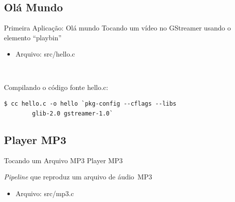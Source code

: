 \documentclass{beamer}
\def\en#1{\foreignlanguage{english}{\emph{#1}}}
\begin{document}
\subsection{Olá Mundo}

\begin{frame}[fragile]{Primeira Aplicação: Olá mundo}
  Tocando um vídeo no GStreamer usando o elemento ``playbin''
  \begin{itemize}
    \item Arquivo: src/hello.c
  \end{itemize}
  ~

  Compilando o código fonte hello.c:
  \begin{lstlisting}[style=command]
  $ cc hello.c -o hello `pkg-config --cflags --libs
        glib-2.0 gstreamer-1.0`
  \end{lstlisting}
\end{frame}

\subsection{Player MP3}

\begin{frame}[c]{Tocando um Arquivo MP3}
  Player MP3
  \begin{figure}[t]
    \centering
  \end{figure}
  \en{Pipeline} que reproduz um arquivo de áudio~MP3
  ~
  \begin{itemize}
    \item Arquivo: src/mp3.c
  \end{itemize}
\end{frame}
\end{document}
